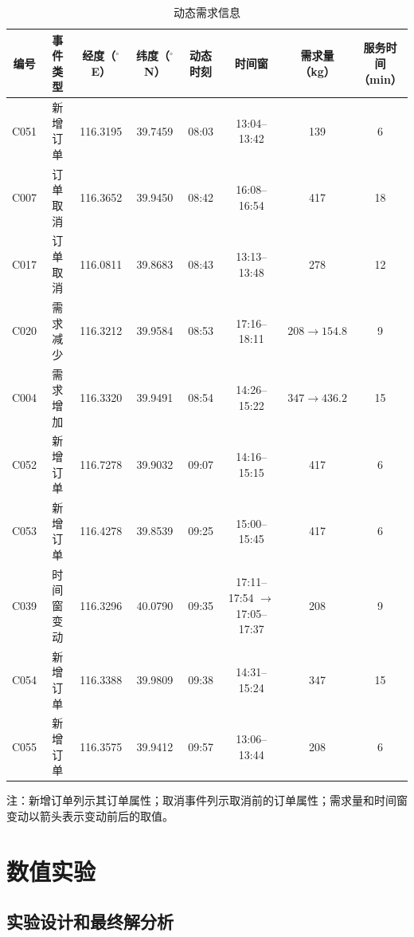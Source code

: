 \documentclass{setp-new}
\begin{document}
\begin{table}[H]
\centering
\caption{动态需求信息}
\label{tab:dynamic-nodes}
\small
\renewcommand{\arraystretch}{0.90}
\setlength{\tabcolsep}{1.0pt}
\begin{tabular*}{\textwidth}{@{\extracolsep{\fill}}cccccccc@{}}
\toprule
编号 & 事件类型 & 经度（$^{\circ}$E） & 纬度（$^{\circ}$N） & 动态时刻 & 时间窗 & \makecell{需求量\\（kg）} & \makecell{服务时间\\（min）}\\
\midrule
C051 & 新增订单 & 116.3195 & 39.7459 & 08:03 & 13:04--13:42 & 139 & 6\\
C007 & 订单取消 & 116.3652 & 39.9450 & 08:42 & 16:08--16:54 & 417 & 18\\
C017 & 订单取消 & 116.0811 & 39.8683 & 08:43 & 13:13--13:48 & 278 & 12\\
C020 & 需求减少 & 116.3212 & 39.9584 & 08:53 & 17:16--18:11 & $208\rightarrow154.8$ & 9\\
C004 & 需求增加 & 116.3320 & 39.9491 & 08:54 & 14:26--15:22 & $347\rightarrow436.2$ & 15\\
C052 & 新增订单 & 116.7278 & 39.9032 & 09:07 & 14:16--15:15 & 417 & 6\\
C053 & 新增订单 & 116.4278 & 39.8539 & 09:25 & 15:00--15:45 & 417 & 6\\
C039 & 时间窗变动 & 116.3296 & 40.0790 & 09:35 & \makecell{17:11--17:54\\$\rightarrow$17:05--17:37} & 208 & 9\\
C054 & 新增订单 & 116.3388 & 39.9809 & 09:38 & 14:31--15:24 & 347 & 15\\
C055 & 新增订单 & 116.3575 & 39.9412 & 09:57 & 13:06--13:44 & 208 & 6\\
\bottomrule
\end{tabular*}
\vspace{2pt}
\parbox{\textwidth}{\footnotesize 注：新增订单列示其订单属性；取消事件列示取消前的订单属性；需求量和时间窗变动以箭头表示变动前后的取值。}
\end{table}

\section{数值实验}

\subsection{实验设计和最终解分析}
\end{document}
